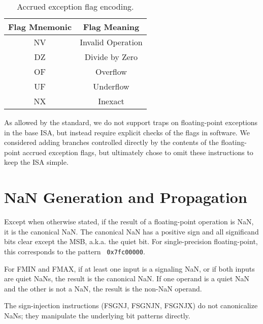 \begin{table}[htp]
\begin{small}
\begin{center}
\begin{tabular}{cl}
\hline
\multicolumn{1}{|c|}{Flag Mnemonic} &
\multicolumn{1}{c|}{Flag Meaning} \\
\hline
\multicolumn{1}{|c|}{NV} &
\multicolumn{1}{c|}{Invalid Operation}\\
\hline
\multicolumn{1}{|c|}{DZ} &
\multicolumn{1}{c|}{Divide by Zero}\\
\hline
\multicolumn{1}{|c|}{OF} &
\multicolumn{1}{c|}{Overflow}\\
\hline
\multicolumn{1}{|c|}{UF} &
\multicolumn{1}{c|}{Underflow}\\
\hline
\multicolumn{1}{|c|}{NX} &
\multicolumn{1}{c|}{Inexact}\\
\hline
\end{tabular}
\end{center}
\end{small}
\caption{Accrued exception flag encoding.}
\label{bitdef}
\end{table}

\begin{commentary}
As allowed by the standard, we do not support traps on floating-point
exceptions in the base ISA, but instead require explicit checks of the flags
in software.  We considered adding branches controlled directly by the
contents of the floating-point accrued exception flags, but ultimately chose
to omit these instructions to keep the ISA simple.
\end{commentary}

\section{NaN Generation and Propagation}

Except when otherwise stated, if the result of a floating-point operation is
NaN, it is the canonical NaN.  The canonical NaN has a positive sign and all
significand bits clear except the MSB, a.k.a. the quiet bit.  For
single-precision floating-point, this corresponds to the pattern {\tt
0x7fc00000}.

For FMIN and FMAX, if at least one input is a signaling NaN, or if both inputs
are quiet NaNs, the result is the canonical NaN.  If one operand is a quiet NaN
and the other is not a NaN, the result is the non-NaN operand.

The sign-injection instructions (FSGNJ, FSGNJN, FSGNJX) do not canonicalize
NaNs; they manipulate the underlying bit patterns directly.


